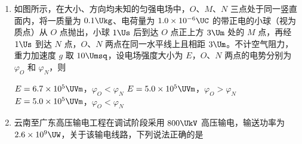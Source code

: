 \documentclass[\gkver]{gaokaozhenti}
\begin{document}
\begin{enumerate}
{故选 D。
}
\item
如图所示，在大小、方向均未知的匀强电场中，$ O $、$ M $、$ N $ 三点处于同一竖直面内，将一质量为 $ 0.1 \Ukg $、电荷量为 $ 1.0 \times 10 ^{-6} \UC $ 的带正电的小球（视为质点）从 $ O $ 点抛出，小球 $ 1 \Us $ 后到达 $ O $ 点正上方 $ 3 \Um $ 处的 $ M $ 点，再经 $ 1 \Us $ 到达 $ N $ 点，$ O $、$ N $ 两点在同一水平线上且相距 $ 3 \Um $。不计空气阻力，重力加速度 $ g $ 取 $ 10 \Umsq $，设电场强度大小为 $ E $，$ O $、$ N $ 两点的电势分别为 $ \varphi_{O} $ 和 $ \varphi_{N} $，则 
\onepicture[w=4.22cm, h=4.29cm]{}

{$ E =6.7 \times 10 ^{5} \UVm $，$\varphi_{O} < \varphi_{N}$}
{$ E =5.0 \times 10 ^{5} \UVm $，$\varphi_{O} > \varphi_{N}$}
{$ E =5.0 \times 10 ^{5} \UVm $，$\varphi_{O} < \varphi_{N}$}


\item
云南至广东高压输电工程在调试阶段采用 $ 800 \UkV $ 高压输电，输送功率为 $ 2.6 \times 10 ^{9} \UW $，关于该输电线路，下列说法正确的是 



\end{enumerate}
\end{document}
